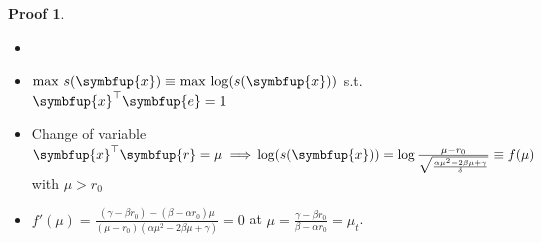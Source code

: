 \documentclass[11pt]{extarticle}
\newcommand{\ds}{\displaystyle}
\newcommand{\ie}{\;\Longrightarrow\;}
\newcommand{\vx}{\symbfup{x}}
\newcommand{\vbb}{\symbfup{\beta}}
\newcommand{\vR}{\symbfup{R}}
\newcommand{\vV}{\symbfup{V}}
\newcommand{\ve}{\symbfup{e}}
\newcommand{\vr}{\symbfup{r}}
\DeclareMathOperator\var{var}
\DeclareMathOperator\cov{cov}
\DeclareMathOperator\cor{cor}
\theoremstyle{definition}
\newtheorem*{prf}{Proof}
\begin{document}
\begin{prf}
  \begin{itemize}
    \item[]
    \item $\ds\max\,s(\vx)\equiv\max\,\log(s(\vx))$ s.t. $\ds\vx^\top\ve = 1$ 
    \item Change of variable $\vx^\top\vr = \mu\ie \\ \log(s(\vx)) = \log\frac{\mu - r_0}{\sqrt{\frac{\alpha\mu^2 - 2\beta\mu + \gamma}{\delta}}}\equiv f(\mu)$ with $\mu > r_0$
    \item $\ds f'(\mu) = \frac{(\gamma - \beta r_0) - (\beta - \alpha r_0)\mu}{(\mu - r_0)\left(\alpha\mu^2 - 2\beta\mu + \gamma\right)} = 0$ at $\ds\mu = \frac{\gamma - \beta r_0}{\beta - \alpha r_0} = \mu_t$.
  \end{itemize}
\end{prf}




\end{document}
